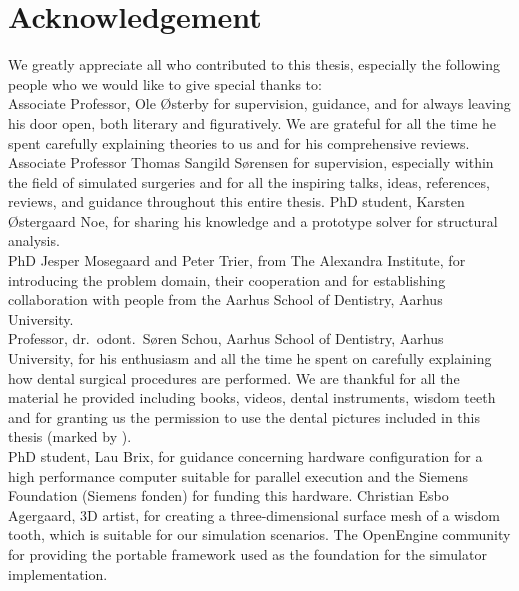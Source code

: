 
\chapter*{Acknowledgement}
We greatly appreciate all who contributed to this thesis,
especially the following people who we would like to give special
thanks to: \\ 

Associate Professor, Ole Østerby for supervision, guidance, and
for always leaving his door open, both literary and figuratively. We
are grateful for all the time he spent carefully explaining theories
to us and for his comprehensive reviews. 
%
Associate Professor Thomas Sangild Sørensen for supervision, especially within the field
of simulated surgeries and for all the inspiring talks, ideas,
references, reviews, and guidance throughout this entire thesis.
%
PhD student, Karsten Østergaard Noe, for sharing his knowledge and
a prototype solver for structural analysis. \\

PhD Jesper Mosegaard and Peter Trier, from The Alexandra
Institute, for introducing the problem domain, their cooperation and
for establishing collaboration with people from the Aarhus School of
Dentistry, Aarhus University. \\

Professor, dr.~odont.~Søren Schou, Aarhus School of Dentistry, Aarhus
University, for his enthusiasm and all the time he spent on carefully
explaining how dental surgical procedures are performed. We are
thankful for all the material he provided including books, videos,
dental instruments, wisdom teeth and for granting us the permission to
use the dental pictures included in this thesis (marked by \textdagger). \\

PhD student, Lau Brix, for guidance concerning hardware
configuration for a high performance computer suitable for parallel
execution
%
and the Siemens Foundation (Siemens fonden) for funding this
hardware.
%
Christian Esbo Agergaard, 3D artist, for creating a three-dimensional
surface mesh of a wisdom tooth, which is suitable for our simulation
scenarios.
%
The OpenEngine community for providing the portable framework used as
the foundation for the simulator implementation.
